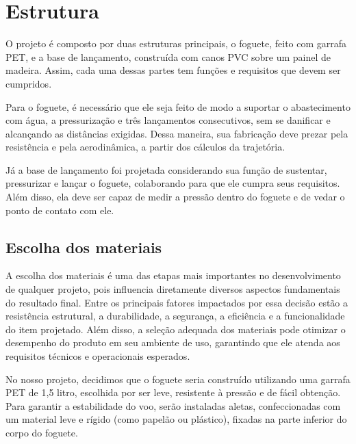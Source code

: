 \section{Estrutura}

O projeto é composto por duas estruturas principais, o foguete, feito com garrafa PET, e a base de lançamento, construída com canos PVC sobre um painel de madeira. Assim, cada uma dessas partes tem funções e requisitos que devem ser cumpridos. 

Para o foguete, é necessário que ele seja feito de modo a suportar o abastecimento com água, a pressurização e três lançamentos consecutivos, sem se danificar e alcançando as distâncias exigidas. Dessa maneira, sua fabricação deve prezar pela resistência e pela aerodinâmica, a partir dos cálculos da trajetória.

Já a base de lançamento foi projetada considerando sua função de sustentar, pressurizar e lançar o foguete, colaborando para que ele cumpra seus requisitos. Além disso, ela deve ser capaz de medir a pressão dentro do foguete e de vedar o ponto de contato com ele.


\subsection{Escolha dos materiais}
A escolha dos materiais é uma das etapas mais importantes no desenvolvimento de qualquer projeto, pois influencia diretamente diversos aspectos fundamentais do resultado final. Entre os principais fatores impactados por essa decisão estão a resistência estrutural, a durabilidade, a segurança, a eficiência e a funcionalidade do item projetado. Além disso, a seleção adequada dos materiais pode otimizar o desempenho do produto em seu ambiente de uso, garantindo que ele atenda aos requisitos técnicos e operacionais esperados.

No nosso projeto, decidimos que o foguete seria construído utilizando uma garrafa PET de 1,5 litro, escolhida por ser leve, resistente à pressão e de fácil obtenção. Para garantir a estabilidade do voo, serão instaladas aletas, confeccionadas com um material leve e rígido (como papelão ou plástico), fixadas na parte inferior do corpo do foguete.

